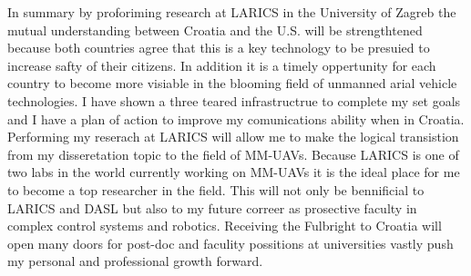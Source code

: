 \documentclass[12pt]{article}
\begin{document}
In summary by proforiming research at LARICS in the University of Zagreb the mutual understanding between Croatia and the U.S. will be strengthtened because both countries agree that this is a key technology to be presuied to increase safty of their citizens.
In addition it is a timely oppertunity for each country to become more visiable in the blooming field of unmanned arial vehicle technologies.  
I have shown a three teared infrastructrue to complete my set goals and I have a plan of action to improve my comunications ability when in Croatia.
Performing my reserach at LARICS will allow me to make the logical transistion from my disseretation topic to the field of MM-UAVs.  
Because LARICS is one of two labs in the world currently working on MM-UAVs it is the ideal place for me to become  a top researcher in the field.  
This will not only be bennificial to LARICS and DASL but also to my future correer as prosective faculty in complex control systems and robotics.
Receiving the Fulbright to Croatia will open many doors for post-doc and faculity possitions at universities vastly push my personal and professional growth forward.
\end{document}
